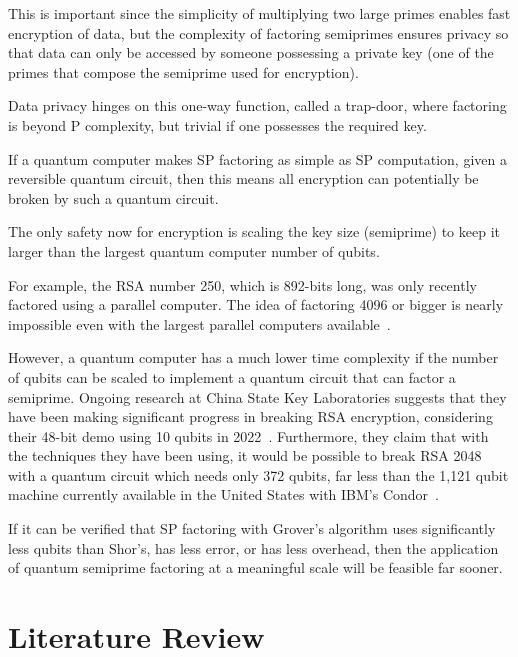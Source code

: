 \documentclass[twocolumn]{cinc}
\begin{document}
  This is important since the simplicity of multiplying two large primes enables fast encryption of data, 
  but the complexity of factoring semiprimes ensures privacy so that data can only be accessed by someone possessing a private key 
  (one of the primes that compose the semiprime used for encryption).

  Data privacy hinges on this one-way function, called a trap-door, where factoring 
  is beyond P complexity, but trivial if one possesses the required key. 

  If a quantum computer makes SP factoring as simple as SP computation, given a 
  reversible quantum circuit, then this means all encryption can potentially 
  be broken by such a quantum circuit. 

  The only safety now for encryption is scaling the key size (semiprime) to keep 
  it larger than the largest quantum computer number of qubits.

  For example, the RSA number 250, which is 892-bits long, was only recently factored using a parallel computer. 
  The idea of factoring 4096 or bigger is nearly impossible even with the largest parallel computers available~\cite{FergusonSchneier2003}. 

  However, a quantum computer has a much lower time complexity if the number of qubits
  can be scaled to implement a quantum circuit that can factor a semiprime. Ongoing research
  at China State Key Laboratories suggests that they have been making significant
  progress in breaking RSA encryption, considering their 48-bit demo using 10 qubits
  in 2022~\cite{yan2022factoringintegerssublinearresources}. Furthermore, they claim
  that with the techniques they have been using, it would be possible to break
  RSA 2048 with a quantum circuit which needs only 372 qubits, far less than the
  1,121 qubit machine currently available in the United 
  States with IBM's Condor~\cite{abughanem2024ibmquantumcomputersevolution}.


  If it can be verified that SP factoring with Grover's algorithm
  uses significantly less qubits than Shor's, has less error, or has less overhead,
  then the application of quantum semiprime factoring at a meaningful scale 
  will be feasible far sooner.

\section{Literature Review}
\end{document}
